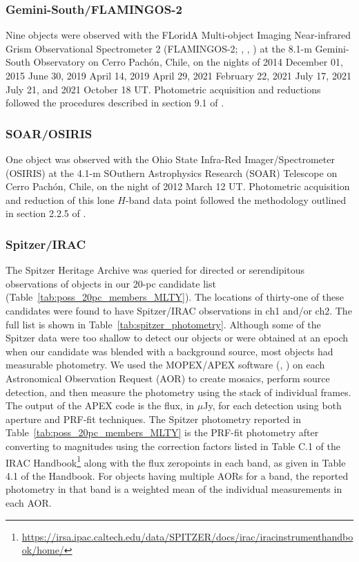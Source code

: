 \documentclass[twocolumn,tighten,twocolappendix]{aastex631}
\begin{document}
\subsubsection{Gemini-South/FLAMINGOS-2}

Nine objects were observed with the FLoridA Multi-object Imaging Near-infrared Grism Observational Spectrometer 2 (FLAMINGOS-2; \citealt{eikenberry2006}, \citealt{elston2003}, \citealt{jannuzi2004}) at the 8.1-m Gemini-South Observatory on Cerro Pach{\'o}n, Chile, on the nights of 2014 December 01, 2015 June 30, 2019 April 14, 2019 April 29, 2021 February 22, 2021 July 17, 2021 July 21, and 2021 October 18 UT. Photometric acquisition and reductions followed the procedures described in section 9.1 of \cite{meisner2020a}.

\subsubsection{SOAR/OSIRIS}

One object was observed with the Ohio State Infra-Red Imager/Spectrometer (OSIRIS) at the 4.1-m SOuthern Astrophysics Research (SOAR) Telescope on Cerro Pach{\'o}n, Chile, on the night of 2012 March 12 UT. Photometric acquisition and reduction of this lone $H$-band data point followed the methodology outlined in section 2.2.5 of \cite{kirkpatrick2012}.

\subsubsection{Spitzer/IRAC}

The Spitzer Heritage Archive was queried for directed or serendipitous observations of objects in our 20-pc candidate list (Table~\ref{tab:poss_20pc_members_MLTY}). The locations of thirty-one of these candidates were found to have Spitzer/IRAC observations in ch1 and/or ch2. The full list is shown in Table~\ref{tab:spitzer_photometry}. Although some of the Spitzer data were too shallow to detect our objects or were obtained at an epoch when our candidate was blended with a background source, most objects had measurable photometry. We used the MOPEX/APEX software (\citealt{makovoz2005a}, \citealt{makovoz2005b}) on each Astronomical Observation Request (AOR) to create mosaics, perform source detection, and then measure the photometry using the stack of individual frames. The output of the APEX code is the flux, in $\mu$Jy, for each detection using both aperture and PRF-fit techniques. The Spitzer photometry reported in Table~\ref{tab:poss_20pc_members_MLTY} is the PRF-fit photometry after converting to magnitudes using the correction factors listed in Table C.1 of the IRAC Handbook\footnote{\url {https://irsa.ipac.caltech.edu/data/SPITZER/docs/irac/iracinstrumenthandbook/home/}} along with the flux zeropoints in each band, as given in Table 4.1 of the Handbook. For objects having multiple AORs for a band, the reported photometry in that band is a weighted mean of the individual measurements in each AOR.
\end{document}
